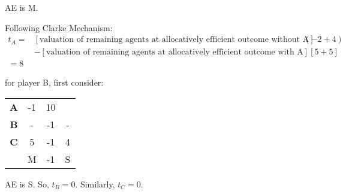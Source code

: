 \documentclass[10pt,a4paper]{article}
\begin{document}
AE is M. 

Following Clarke Mechanism:
\begin{align*}
t_A = &[\text{valuation of remaining agents at allocatively efficient outcome without A}](-2+4)  \\
     & - [\text{valuation of remaining agents at allocatively efficient outcome with A}][5+5] \\
     = 8
\end{align*}


for player B, first consider:

\begin{tabular}{cccc}
\textbf{A}    & -1 &  10 & \\
\textbf{B}    &  - & -1 &  -   \\
\textbf{C}    &  5 & -1 &  4  \\
     &  M & -1 &  S 
\end{tabular}

AE is S.  So, $t_B = 0$. Similarly, $t_C = 0$.


\nocite{*}


\end{document}
